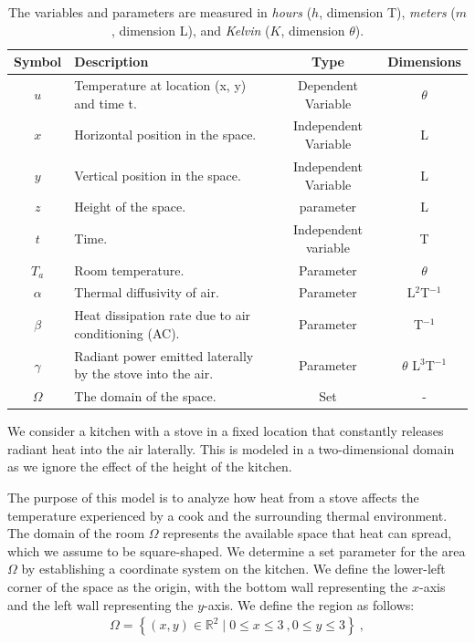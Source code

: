 \documentclass{article}
\begin{document}
\begin{table}[!h]
\begin{center}
\begin{tabular}{||c | p{7.5cm} | c | c||} 
 \hline
 Symbol & Description & Type & Dimensions \\ [0.3ex] 
 \hline\hline
 $u$ & Temperature at location (x, y) and time t. & Dependent Variable & $\theta$ \\ 
 \hline
 $x$ & Horizontal position in the space. & Independent Variable & L \\ 
 \hline
 $y$ & Vertical position in the space.  & Independent Variable & L \\ 
 \hline
 $z$ & Height of the space. & parameter & L \\ 
 \hline
 $t$ & Time. & Independent variable & T \\ 
 \hline
 $T_a$ & Room temperature. & Parameter & $\theta$ \\ 
 \hline
 $\alpha$ & Thermal diffusivity of air. & Parameter & L$^2$T$^{-1}$ \\ 
 \hline
 $\beta$ & Heat dissipation rate due to air conditioning (AC). & Parameter & T$^{-1}$ \\ 
 \hline
 $\gamma$ & Radiant power emitted laterally by the stove into the air. & Parameter & $\theta$ L$^3$T$^{-1}$ \\ 
 \hline
 $\Omega$ & The domain of the space. & Set & - \\ 
 \hline
\end{tabular} 
\end{center}
\captionsetup{font=small}
\caption{The variables and parameters are measured in \textit{hours} ($h$, dimension T), \textit{meters} ($m$, dimension L), and \textit{Kelvin} ($K$, dimension $\theta$).} %
\end{table}

\noindent We consider a kitchen with a stove in a fixed location that constantly releases radiant heat into the air laterally. This is modeled in a two-dimensional domain as we ignore the effect of the height of the kitchen. 

\vspace{3mm}

\noindent The purpose of this model is to analyze how heat from a stove affects the temperature experienced by a cook and the surrounding thermal environment. The domain of the room $\Omega$ represents the available space that heat can spread, which we assume to be square-shaped. We determine a set parameter for the area $\Omega$ by establishing a coordinate system on the kitchen. We define the lower-left corner of the space as the origin, with the bottom wall representing the $x$-axis and the left wall representing the $y$-axis. We define the region as follows:
\begin{align*}
    \Omega = \left\{ (x, y)\in\mathbb{R}^2 \mid 0\le x \le 3 \ , 0 \le y \le 3 \right\} \ , 
\end{align*}
\end{document}
